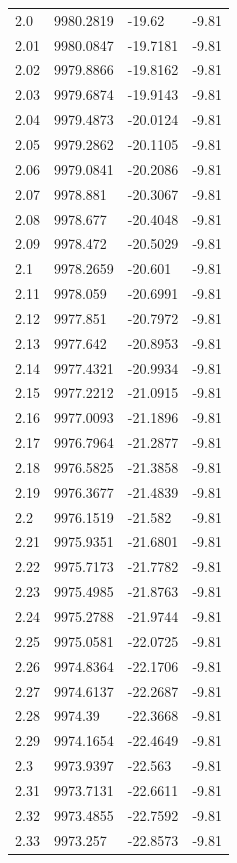 \begin{table}[H]
\begin{tabular}{llll}
2.0 & 9980.2819 & -19.62 & -9.81 \\
2.01 & 9980.0847 & -19.7181 & -9.81 \\
2.02 & 9979.8866 & -19.8162 & -9.81 \\
2.03 & 9979.6874 & -19.9143 & -9.81 \\
2.04 & 9979.4873 & -20.0124 & -9.81 \\
2.05 & 9979.2862 & -20.1105 & -9.81 \\
2.06 & 9979.0841 & -20.2086 & -9.81 \\
2.07 & 9978.881 & -20.3067 & -9.81 \\
2.08 & 9978.677 & -20.4048 & -9.81 \\
2.09 & 9978.472 & -20.5029 & -9.81 \\
2.1 & 9978.2659 & -20.601 & -9.81 \\
2.11 & 9978.059 & -20.6991 & -9.81 \\
2.12 & 9977.851 & -20.7972 & -9.81 \\
2.13 & 9977.642 & -20.8953 & -9.81 \\
2.14 & 9977.4321 & -20.9934 & -9.81 \\
2.15 & 9977.2212 & -21.0915 & -9.81 \\
2.16 & 9977.0093 & -21.1896 & -9.81 \\
2.17 & 9976.7964 & -21.2877 & -9.81 \\
2.18 & 9976.5825 & -21.3858 & -9.81 \\
2.19 & 9976.3677 & -21.4839 & -9.81 \\
2.2 & 9976.1519 & -21.582 & -9.81 \\
2.21 & 9975.9351 & -21.6801 & -9.81 \\
2.22 & 9975.7173 & -21.7782 & -9.81 \\
2.23 & 9975.4985 & -21.8763 & -9.81 \\
2.24 & 9975.2788 & -21.9744 & -9.81 \\
2.25 & 9975.0581 & -22.0725 & -9.81 \\
2.26 & 9974.8364 & -22.1706 & -9.81 \\
2.27 & 9974.6137 & -22.2687 & -9.81 \\
2.28 & 9974.39 & -22.3668 & -9.81 \\
2.29 & 9974.1654 & -22.4649 & -9.81 \\
2.3 & 9973.9397 & -22.563 & -9.81 \\
2.31 & 9973.7131 & -22.6611 & -9.81 \\
2.32 & 9973.4855 & -22.7592 & -9.81 \\
2.33 & 9973.257 & -22.8573 & -9.81 \\

\end{tabular}
\end{table}
